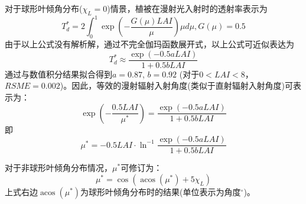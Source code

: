 对于球形叶倾角分布($\chi_L=0$)情景，植被在漫射光入射时的透射率表示为
\begin{equation}
T_{d}^{*}=2 \int_{0}^{1} \exp \left(-\frac{G(\mu) LAI}{\mu}\right) \mu d \mu, G(\mu)=0.5
\end{equation}
由于以上公式没有解析解，通过不完全伽玛函数展开式，以上公式可近似表达为
\begin{equation}
T_{d}^{*} \approx \frac{\exp (-0.5 a LAI)}{1+0.5 b LAI}
\end{equation}
通过与数值积分结果拟合得到$a=0.87$, $b=0.92$ (对于$0<LAI<8$，$RSME=0.002$)。因此，等效的漫射辐射入射角度(类似于直射辐射入射角度)可表示为：
\begin{equation}
\exp \left(-\frac{0.5 LAI}{\mu^{*}}\right)=\frac{\exp (-0.5 a LAI)}{1+0.5 b LAI}
\end{equation}
即
\begin{equation}
\mu^{*}=-0.5 LAI \cdot \ln ^{-1} \frac{\exp (-0.5 a LAI)}{1+0.5 b LAI}
\end{equation}

对于非球形叶倾角分布情况，$\mu^\ast$可修订为：
\begin{equation}
\mu^{*}=\cos \left(\operatorname{acos}\left(\mu^{*}\right)+5 \chi_{L}\right)
\end{equation}
上式右边$\operatorname{acos}\left(\mu^{*}\right)$为球形叶倾角分布时的结果(单位表示为角度$^{\circ}$)。


